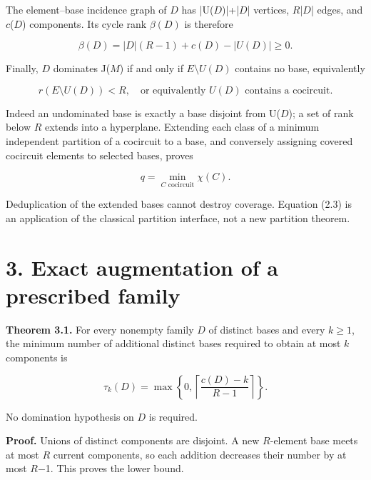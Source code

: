 \documentclass[11pt]{article}
\begin{document}
The element--base incidence graph of \(D\) has |U(\(D\))|+|\(D\)| vertices, \(R\)|\(D\)| edges, and \(c\)(\(D\)) components. Its cycle rank \(\beta(D)\) is therefore

\[
\beta(D)=|D|(R-1)+c(D)-|U(D)|\ge0.                 \tag{2.1}
\]

Finally, \(D\) dominates J(\(M\)) if and only if \(E\setminus U(D)\) contains no base, equivalently

\[
r(E\setminus U(D))<R,
\quad\text{or equivalently }U(D)\text{ contains a cocircuit}.       \tag{2.2}
\]

Indeed an undominated base is exactly a base disjoint from U(\(D\)); a set of rank below \(R\) extends into a hyperplane. Extending each class of a minimum independent partition of a cocircuit to a base, and conversely assigning covered cocircuit elements to selected bases, proves

\[
q=\min_{C\text{ cocircuit}}\chi(C).                 \tag{2.3}
\]

Deduplication of the extended bases cannot destroy coverage. Equation (2.3) is an application of the classical partition interface, not a new partition theorem.

\section*{3. Exact augmentation of a prescribed family}

\textbf{Theorem 3.1.} For every nonempty family \(D\) of distinct bases and every \(k\ge1\), the minimum number of additional distinct bases required to obtain at most \(k\) components is

\[
\tau_k(D)=\max\left\{0,\left\lceil\frac{c(D)-k}{R-1}\right\rceil\right\}.       \tag{3.1}
\]

No domination hypothesis on \(D\) is required.

\textbf{Proof.} Unions of distinct components are disjoint. A new \(R\)-element base meets at most \(R\) current components, so each addition decreases their number by at most \(R\)\ensuremath{-}1. This proves the lower bound.
\end{document}
